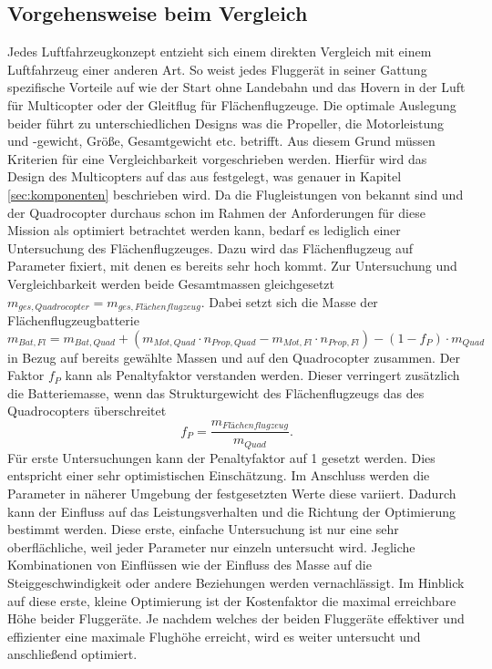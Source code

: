 \subsection{Vorgehensweise beim Vergleich}
\label{sec:vorgehenswiese_vergleich}
Jedes Luftfahrzeugkonzept entzieht sich einem direkten Vergleich mit einem Luftfahrzeug einer anderen Art. So weist jedes Fluggerät in seiner Gattung spezifische Vorteile auf wie der Start ohne Landebahn und das Hovern in der Luft für Multicopter oder der Gleitflug für Flächenflugzeuge. Die optimale Auslegung beider führt zu unterschiedlichen Designs was die Propeller, die Motorleistung und -gewicht, Größe, Gesamtgewicht etc. betrifft. Aus diesem Grund müssen Kriterien für eine Vergleichbarkeit vorgeschrieben werden. Hierfür wird das Design des Multicopters auf das aus \cite{Anderson.2018} festgelegt, was genauer in Kapitel \ref{sec:komponenten} beschrieben wird. Da die Flugleistungen von \cite{Anderson.2018} bekannt sind und der Quadrocopter durchaus schon im Rahmen der Anforderungen für diese Mission als optimiert betrachtet werden kann, bedarf es lediglich einer Untersuchung des Flächenflugzeuges. Dazu wird das Flächenflugzeug auf Parameter fixiert, mit denen es bereits sehr hoch kommt. Zur Untersuchung und Vergleichbarkeit werden beide Gesamtmassen gleichgesetzt \ensuremath{m_{ges,Quadrocopter} = m_{ges,Flächenflugzeug}}. Dabei setzt sich die Masse der Flächenflugzeugbatterie   
\begin{equation}
	m_{Bat,Fl} = m_{Bat,Quad} + (m_{Mot,Quad}\cdot n_{Prop,Quad} - m_{Mot,Fl}\cdot n_{Prop,Fl}) - (1-f_P)\cdot m_{Quad}  
\end{equation}
in Bezug auf bereits gewählte Massen und auf den Quadrocopter zusammen. Der Faktor \ensuremath{f_P} kann als Penaltyfaktor verstanden werden. Dieser verringert zusätzlich die Batteriemasse, wenn das Strukturgewicht des Flächenflugzeugs das des Quadrocopters überschreitet
\begin{equation}
	f_P = \frac{m_{Flächenflugzeug}}{m_{Quad}}.
\end{equation} 
Für erste Untersuchungen kann der Penaltyfaktor auf 1 gesetzt werden. Dies entspricht einer sehr optimistischen Einschätzung. Im Anschluss werden die Parameter in näherer Umgebung der festgesetzten Werte diese variiert. Dadurch kann der Einfluss auf das Leistungsverhalten und die Richtung der Optimierung bestimmt werden. Diese erste, einfache Untersuchung ist nur eine sehr oberflächliche, weil jeder Parameter nur einzeln untersucht wird. Jegliche Kombinationen von Einflüssen wie der Einfluss des Masse auf die Steiggeschwindigkeit oder andere Beziehungen werden vernachlässigt. Im Hinblick auf diese erste, kleine Optimierung ist der Kostenfaktor die maximal erreichbare Höhe beider Fluggeräte. Je nachdem welches der beiden Fluggeräte effektiver und effizienter eine maximale Flughöhe erreicht, wird es weiter untersucht und anschließend optimiert. 

